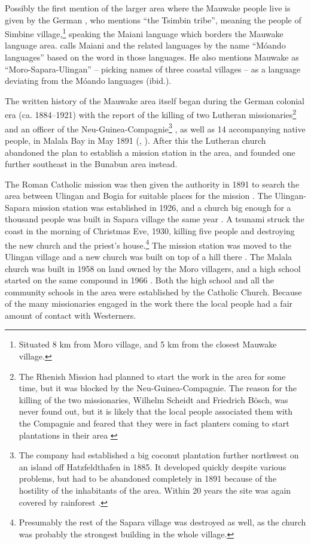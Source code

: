 Possibly the first mention of the larger area where the Mauwake people live is given by the German \citet[338]{Hollrung1888}, who mentions ``the Tsimbin tribe'', meaning the people of Simbine village,\footnote{Situated 8 km from Moro village, and 5 km from the closest Mauwake village.} speaking the Maiani language which borders the Mauwake language area. \citet[964]{Holtker1937} calls Maiani and the related languages by the name ``M\'oando languages'' based on the word  in those languages.  He also mentions Mauwake as ``Moro-Sapara-Ulingan'' -- picking names of three coastal villages -- as a language deviating from the M\'oando languages (ibid.). 

The written history of the Mauwake area itself began during the German colonial era (ca. 1884--1921) with the report of the killing of two Lutheran missionaries\footnote{The Rhenish Mission had planned to start the work in the area for some time, but it was blocked by the Neu-Guinea-Compagnie. The reason for the killing of the two missionaries, Wilhelm Scheidt and Friedrich Bösch, was never found out, but it is likely that the local people associated them with the Compagnie and feared that they were in fact planters coming to start plantations in their area \citep[106--107]{WagnerEtAl1986}} and an officer of the Neu-Guinea-Compagnie\footnote{The company had established a big coconut plantation further northwest on an island off Hatzfeldthafen in 1885. It developed quickly despite  various problems, but had to be abandoned completely in 1891 because of the hostility of the inhabitants of the area. Within 20 years the site was again covered by rainforest \citep[450--51]{Tranel1952}.} , as well as 14 accompanying native people, in Malala Bay in May 1891 (\citealt[454]{Tranel1952}, \citealt[106--109]{WagnerEtAl1986}).  After this the Lutheran church abandoned the plan to establish a mission station in the area, and founded one further southeast in the Bunabun area instead.

The Roman Catholic mission was then given the authority in 1891 to search the area between Ulingan and Bogia for suitable places for the mission \citep[8]{Duamba1996}.  The Ulingan-Sapara mission station was established in 1926, and a church big enough for a thousand people was built in Sapara village the same year \citep[21]{BrummEtAl1995}%
.  A tsunami struck the coast in the morning of Christmas Eve, 1930, killing five people and destroying the new church and the priest's house.\footnote{Presumably the rest of the Sapara village was destroyed as well, as the church was probably the strongest building in the whole village.}  The mission station was moved to the Ulingan village and a new church was built on top of a hill there \citep[20--21]{Davies1999}. The Malala church was built in 1958 on land owned by the Moro villagers, and a high school started on the same compound in 1966 \citep[45]{BrummEtAl1995}%
. Both the high school and all the community schools in the area were established by the Catholic Church.  Because of the many missionaries engaged in the work there the local people had a fair amount of contact with Westerners.

